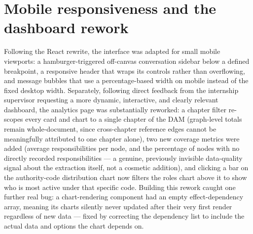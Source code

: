 \section{Mobile responsiveness and the dashboard rework}
Following the React rewrite, the interface was adapted for small mobile viewports: a hamburger-triggered off-canvas conversation sidebar below a defined breakpoint, a responsive header that wraps its controls rather than overflowing, and message bubbles that use a percentage-based width on mobile instead of the fixed desktop width. Separately, following direct feedback from the internship supervisor requesting a more dynamic, interactive, and clearly relevant dashboard, the analytics page was substantially reworked: a chapter filter re-scopes every card and chart to a single chapter of the DAM (graph-level totals remain whole-document, since cross-chapter reference edges cannot be meaningfully attributed to one chapter alone), two new coverage metrics were added (average responsibilities per node, and the percentage of nodes with no directly recorded responsibilities — a genuine, previously invisible data-quality signal about the extraction itself, not a cosmetic addition), and clicking a bar on the authority-code distribution chart now filters the roles chart above it to show who is most active under that specific code. Building this rework caught one further real bug: a chart-rendering component had an empty effect-dependency array, meaning its charts silently never updated after their very first render regardless of new data — fixed by correcting the dependency list to include the actual data and options the chart depends on.

